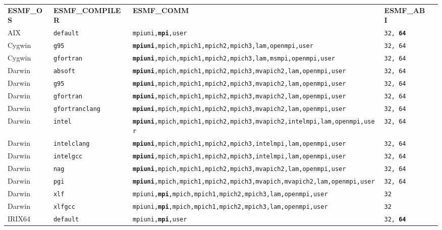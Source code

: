 \begin{longtable}{lllll}
  {\bfseries\footnotesize ESMF\_OS} &{\bfseries\footnotesize ESMF\_COMPILER} & {\bfseries\footnotesize ESMF\_COMM} & {\bfseries\footnotesize ESMF\_ABI} \\

AIX     &\tt default     &\footnotesize \tt mpiuni,{\bf mpi},user      &\tt 32, {\bf 64} \\
Cygwin  &\tt g95         &\footnotesize \tt {\bf mpiuni},mpich,mpich1,mpich2,mpich3,lam,openmpi,user &\tt 32, 64 \\
Cygwin  &\tt gfortran    &\footnotesize \tt {\bf mpiuni},mpich,mpich1,mpich2,mpich3,lam,msmpi,openmpi,user &\tt 32, 64 \\
Darwin  &\tt absoft      &\footnotesize \tt {\bf mpiuni},mpich,mpich1,mpich2,mpich3,mvapich2,lam,openmpi,user &\tt 32, 64 \\
Darwin  &\tt g95         &\footnotesize \tt {\bf mpiuni},mpich,mpich1,mpich2,mpich3,mvapich2,lam,openmpi,user &\tt 32, 64 \\
Darwin  &\tt gfortran    &\footnotesize \tt {\bf mpiuni},mpich,mpich1,mpich2,mpich3,mvapich2,lam,openmpi,user &\tt 32, 64 \\
Darwin  &\tt gfortranclang &\footnotesize \tt {\bf mpiuni},mpich,mpich1,mpich2,mpich3,mvapich2,lam,openmpi,user &\tt 32, 64 \\
Darwin  &\tt intel       &\footnotesize \tt {\bf mpiuni},mpich,mpich1,mpich2,mpich3,mvapich2,intelmpi,lam,openmpi,user &\tt 32, 64 \\
Darwin  &\tt intelclang  &\footnotesize \tt {\bf mpiuni},mpich,mpich1,mpich2,mpich3,intelmpi,lam,openmpi,user &\tt 32, 64 \\
Darwin  &\tt intelgcc    &\footnotesize \tt {\bf mpiuni},mpich,mpich1,mpich2,mpich3,intelmpi,lam,openmpi,user &\tt 32, 64 \\
Darwin  &\tt nag         &\footnotesize \tt {\bf mpiuni},mpich,mpich1,mpich2,mpich3,mvapich2,lam,openmpi,user &\tt 32, 64 \\
Darwin  &\tt pgi         &\footnotesize \tt {\bf mpiuni},mpich,mpich1,mpich2,mpich3,mvapich,mvapich2,lam,openmpi,user &\tt 32, 64 \\
Darwin  &\tt xlf         &\footnotesize \tt mpiuni,{\bf mpi},mpich,mpich1,mpich2,mpich3,lam,openmpi,user &\tt 32 \\
Darwin  &\tt xlfgcc      &\footnotesize \tt mpiuni,{\bf mpi},mpich,mpich1,mpich2,mpich3,lam,openmpi,user &\tt 32 \\
IRIX64  &\tt default     &\footnotesize \tt mpiuni,{\bf mpi},user     &\tt 32, {\bf 64} \\

\end{longtable}
